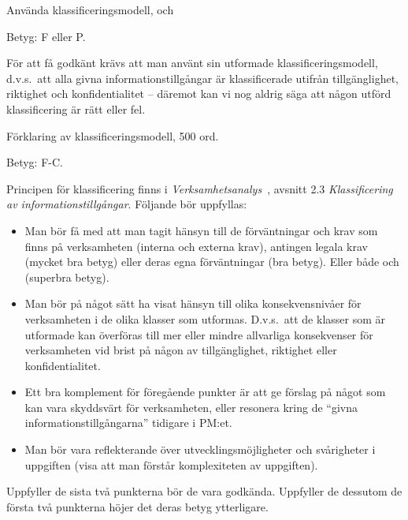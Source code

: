 \documentclass[a4paper]{llncs}
\begin{document}
\begin{exercise}
  Använda klassificeringsmodell, och
  \begin{solution}
    Betyg: F eller P.

    För att få godkänt krävs att man använt sin utformade 
    klassificeringsmodell, d.v.s.\ att alla givna informationstillgångar är 
    klassificerade utifrån tillgänglighet, riktighet och konfidentialitet --
    däremot kan vi nog aldrig säga att någon utförd klassificering är rätt 
    eller fel.
  \end{solution}
\end{exercise}

\begin{exercise}
  Förklaring av klassificeringsmodell, 500 ord.
  \begin{solution}
    Betyg: F-C.

    Principen för klassificering finns 
    i \emph{Verksamhetsanalys}~\cite{MSB2011v}, avsnitt 2.3 
    \emph{Klassificering av informationstillgångar}.
    Följande bör uppfyllas:
    \begin{itemize}
      \item Man bör få med att man tagit hänsyn till de förväntningar och krav 
        som finns på verksamheten (interna och externa krav), antingen legala 
        krav (mycket bra betyg) eller deras egna förväntningar (bra betyg).
        Eller både och (superbra betyg).
      \item Man bör på något sätt ha visat hänsyn till olika konsekvensnivåer 
        för verksamheten i de olika klasser som utformas.
        D.v.s.\ att de klasser som är utformade kan överföras till mer eller 
        mindre allvarliga konsekvenser för verksamheten vid brist på någon av 
        tillgänglighet, riktighet eller konfidentialitet.
      \item Ett bra komplement för föregående punkter är att ge förslag på 
        något som kan vara skyddsvärt för verksamheten, eller resonera kring de 
        \enquote{givna informationstillgångarna} tidigare i PM:et.
      \item Man bör vara reflekterande över utvecklingsmöjligheter och 
        svårigheter i uppgiften (visa att man förstår komplexiteten av 
        uppgiften).
    \end{itemize}
    Uppfyller de sista två punkterna bör de vara godkända.
    Uppfyller de dessutom de första två punkterna höjer det deras betyg 
    ytterligare.
  \end{solution}
\end{exercise}
\end{document}
